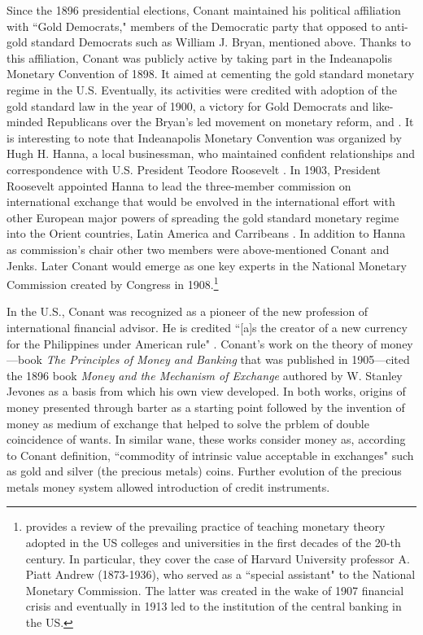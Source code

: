 Since the 1896 presidential elections, Conant maintained his political affiliation with ``Gold Democrats," members of the Democratic party that opposed to anti-gold standard Democrats such as William J. Bryan, mentioned above. Thanks to this affiliation, Conant was publicly active by taking part in the Indeanapolis Monetary Convention of 1898. It aimed at cementing the gold standard monetary regime in the U.S. Eventually, its activities were credited with adoption of the gold standard law in the year of 1900, a victory for Gold Democrats and like-minded Republicans over the Bryan's led movement on monetary reform, \citep[p.~887]{bankersm1908} and \citep[p.~227]{sklansky2017}. It is interesting to note that Indeanapolis Monetary Convention was organized by Hugh H. Hanna, a local businessman, who maintained confident relationships and correspondence with U.S. President Teodore Roosevelt \citep[see][]{hanna1903}. In 1903, President Roosevelt appointed Hanna to lead the three-member commission on international exchange that would be envolved in the international effort with other European major powers of spreading the gold standard monetary regime into the Orient countries, Latin America and Carribeans \citep[p.~243]{sklansky2017}. In addition to Hanna as commission's chair other two members were above-mentioned Conant and Jenks. Later Conant would emerge as one key experts in the National Monetary Commission created by Congress in 1908.\footnote{\cite{samuels1976} provides a review of the prevailing practice of teaching monetary theory adopted in the US colleges and universities in the first decades of the 20-th century. In particular, they cover the case of Harvard University professor A. Piatt Andrew (1873-1936), who served as a ``special assistant" to the National Monetary Commission. The latter was created in the wake of 1907 financial crisis and eventually in 1913 led to the institution of the central banking in the US.}

In the U.S., Conant was recognized as a pioneer of the new profession of international financial advisor. He is credited ``[a]s the creator of a new currency for the Philippines under American rule" \citep[p.~208]{sklansky2017}. Conant's work on the theory of money---book \textit{The Principles of Money and Banking} that was published in 1905---cited the 1896 book \textit{Money and the Mechanism of Exchange} authored by W. Stanley Jevones as a basis from which his own view developed. In both works, origins of money presented through barter as a starting point followed by the invention of money as medium of exchange that helped to solve the prblem of double coincidence of wants. In similar wane, these works consider money as, according to Conant definition, ``commodity of intrinsic value acceptable in exchanges" such as gold and silver (the precious metals) coins. Further evolution of the precious metals money system allowed introduction of credit instruments. 

